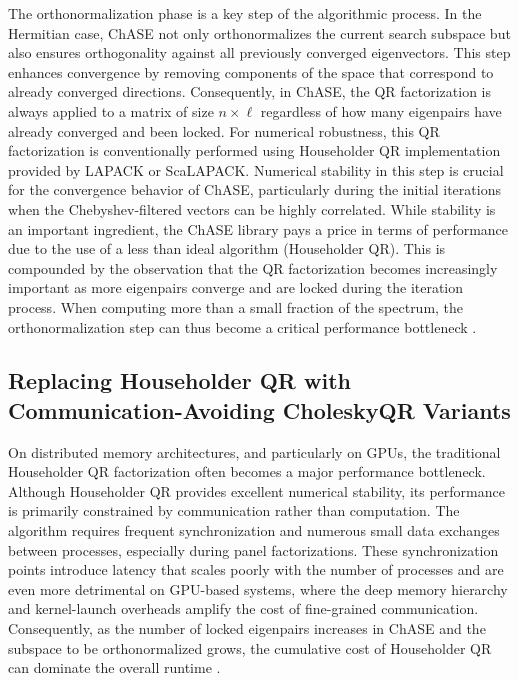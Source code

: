 The orthonormalization phase is a key step of the algorithmic process. 
In the Hermitian case, ChASE not only orthonormalizes
the current search subspace but also ensures orthogonality against all previously
converged eigenvectors. This step enhances convergence by removing components 
of the space that correspond to already converged directions. Consequently, in 
ChASE, the QR factorization is always applied to a matrix of size $n\times \ell$
regardless of how many eigenpairs have already converged and been locked.
For numerical robustness, this QR factorization is conventionally performed 
using Householder QR implementation provided by LAPACK or ScaLAPACK. Numerical
stability in this step is crucial for the convergence behavior of ChASE, particularly 
during the initial iterations when the Chebyshev-filtered vectors can be 
highly correlated. While stability is an important ingredient, the ChASE library pays a price in terms of  performance due to the use of a less than ideal algorithm (Householder QR).
This is compounded by the observation that the QR factorization becomes increasingly
important as more eigenpairs converge and are locked during the iteration process.
When computing more than a small fraction of the spectrum, the orthonormalization
step can thus become a critical performance bottleneck \cite{Wu2022chase}.


\subsection{Replacing Householder QR with Communication-Avoiding CholeskyQR Variants}\label{sec:Replacing Householder QR with Communication-Avoiding CholeskyQR Variants}

On distributed memory architectures, and particularly on GPUs, the traditional Householder QR factorization often becomes a major performance bottleneck. Although Householder QR provides excellent numerical stability, its performance is primarily constrained by communication rather than computation. The algorithm requires frequent synchronization and numerous small data exchanges between processes, especially during panel factorizations. These synchronization points introduce latency that scales poorly with the number of processes and are even more detrimental on GPU-based systems, where the deep memory hierarchy and kernel-launch overheads amplify the cost of fine-grained communication. Consequently, as the number of locked eigenpairs increases in ChASE and the subspace to be orthonormalized grows, the cumulative cost of Householder QR can dominate the overall runtime \cite{Wu2022chase}.

